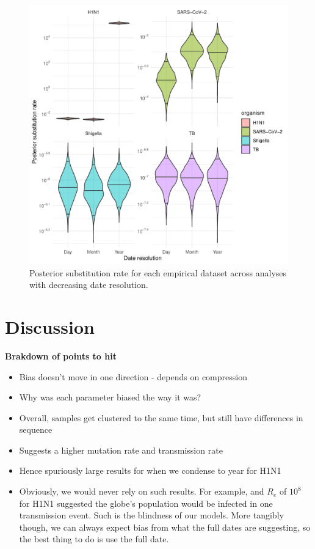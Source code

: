\documentclass{article}
\begin{document}
\begin{spacing}{1.5}
\begin{figure}[h!]
    \centering
    \includegraphics{empirical_clock_trajectory.pdf}
    \caption{Posterior substitution rate for each empirical dataset across analyses with decreasing date resolution.}
    \label{fig:empClock}
\end{figure}

\section*{Discussion}
\textbf{Brakdown of points to hit}
\begin{itemize}
    \item Bias doesn't move in one direction - depends on compression
    \item Why was each parameter biased the way it was?
    \item Overall, samples get clustered to the same time, but still have differences in sequence
    \item Suggests a higher mutation rate and transmission rate
    \item Hence spuriously large results for when we condense to year for H1N1
    \item Obviously, we would never rely on such results. For example, and $R_e$ of $10^8$ for H1N1 suggested the globe's population would be infected in one transmission event. Such is the blindness of our models. More tangibly though, we can always expect bias from what the full dates are suggesting, so the best thing to do is use the full date.
\end{itemize}

\end{spacing}
\end{document}
